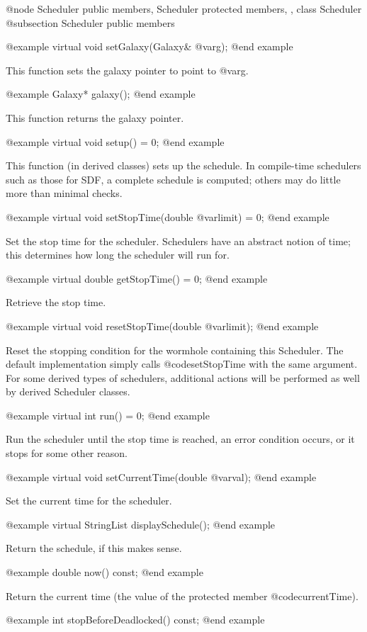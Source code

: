 @node Scheduler public members, Scheduler protected members,  , class Scheduler
@subsection Scheduler public members

@example
virtual void setGalaxy(Galaxy& @var{g});
@end example

This function sets the galaxy pointer to point to @var{g}.

@example
Galaxy* galaxy();
@end example

This function returns the galaxy pointer.

@example
virtual void setup() = 0;
@end example

This function (in derived classes) sets up the schedule.  In
compile-time schedulers such as those for SDF, a complete schedule is
computed; others may do little more than minimal checks.

@example
virtual void setStopTime(double @var{limit}) = 0;
@end example

Set the stop time for the scheduler.  Schedulers have an abstract
notion of time; this determines how long the scheduler will run for.

@example
virtual double getStopTime() = 0;
@end example

Retrieve the stop time.

@example
virtual void resetStopTime(double @var{limit});
@end example

Reset the stopping condition for the wormhole containing this Scheduler.
The default implementation simply calls @code{setStopTime} with
the same argument.  For some derived types of schedulers, additional
actions will be performed as well by derived Scheduler classes.

@example
virtual int run() = 0;
@end example

Run the scheduler until the stop time is reached, an error condition
occurs, or it stops for some other reason.

@example
virtual void setCurrentTime(double @var{val});
@end example

Set the current time for the scheduler.

@example
virtual StringList displaySchedule();
@end example

Return the schedule, if this makes sense.

@example
double now() const;
@end example

Return the current time (the value of the protected member
@code{currentTime}).

@example
int stopBeforeDeadlocked() const;
@end example

